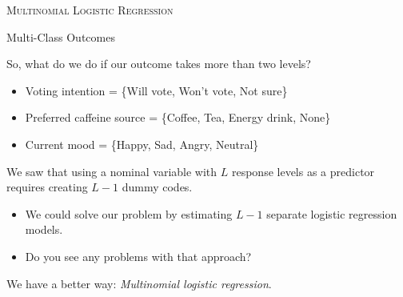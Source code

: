 \documentclass{beamer}\usepackage[]{graphicx}\usepackage[]{color}
\begin{document}

\begin{frame}{}
  
  \begin{center}
    \Huge{\textsc{Multinomial Logistic Regression}}
  \end{center}
  
\end{frame}


\begin{frame}{Multi-Class Outcomes}
  
  So, what do we do if our outcome takes more than two levels?
  \begin{itemize}
    \item Voting intention = \{Will vote, Won't vote, Not sure\}
    \item Preferred caffeine source = \{Coffee, Tea, Energy drink, None\}
    \item Current mood = \{Happy, Sad, Angry, Neutral\}
  \end{itemize}
  \vb
  \pause
  We saw that using a nominal variable with $L$ response levels as a predictor 
  requires creating $L - 1$ dummy codes.
  \begin{itemize}
  \item We could solve our problem by estimating $L - 1$ separate logistic 
    regression models.
  \item Do you see any problems with that approach?
  \end{itemize}
  \vb
  \pause
  We have a better way: \emph{Multinomial logistic regression}.
  
\end{frame}

\end{document}
